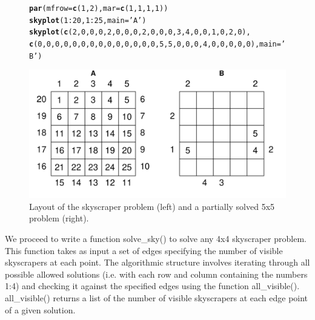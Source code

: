\documentclass[12pt]{article}\usepackage[]{graphicx}\usepackage[]{color}
\makeatletter
\newcommand{\hlnum}[1]{\textcolor[rgb]{0.686,0.059,0.569}{#1}}%
\newcommand{\hlstr}[1]{\textcolor[rgb]{0.192,0.494,0.8}{#1}}%
\newcommand{\hlopt}[1]{\textcolor[rgb]{0,0,0}{#1}}%
\newcommand{\hlstd}[1]{\textcolor[rgb]{0.345,0.345,0.345}{#1}}%
\newcommand{\hlkwc}[1]{\textcolor[rgb]{0.333,0.667,0.333}{#1}}%
\newcommand{\hlkwd}[1]{\textcolor[rgb]{0.737,0.353,0.396}{\textbf{#1}}}%
\newenvironment{kframe}{%
 \def\at@end@of@kframe{}%
 \ifinner\ifhmode%
  \def\at@end@of@kframe{\end{minipage}}%
  \begin{minipage}{\columnwidth}%
 \fi\fi%
 \def\FrameCommand##1{\hskip\@totalleftmargin \hskip-\fboxsep
 \colorbox{shadecolor}{##1}\hskip-\fboxsep
     \hskip-\linewidth \hskip-\@totalleftmargin \hskip\columnwidth}%
 \MakeFramed {\advance\hsize-\width
   \@totalleftmargin\z@ \linewidth\hsize
   \@setminipage}}%
 {\par\unskip\endMakeFramed%
 \at@end@of@kframe}
\newenvironment{knitrout}{}{} %
\makeatother
\begin{document}
\begin{figure}[h!]
  \centering
\begin{knitrout}
\color{fgcolor}\begin{kframe}
\begin{alltt}
\hlkwd{par}\hlstd{(}\hlkwc{mfrow}\hlstd{=}\hlkwd{c}\hlstd{(}\hlnum{1}\hlstd{,}\hlnum{2}\hlstd{),}\hlkwc{mar}\hlstd{=}\hlkwd{c}\hlstd{(}\hlnum{1}\hlstd{,}\hlnum{1}\hlstd{,}\hlnum{1}\hlstd{,}\hlnum{1}\hlstd{))}
\hlkwd{skyplot}\hlstd{(} \hlnum{1}\hlopt{:}\hlnum{20}\hlstd{,} \hlnum{1}\hlopt{:}\hlnum{25}\hlstd{,} \hlkwc{main} \hlstd{=} \hlstr{'A'}\hlstd{)}
\hlkwd{skyplot}\hlstd{(} \hlkwd{c}\hlstd{(}\hlnum{2}\hlstd{,}\hlnum{0}\hlstd{,}\hlnum{0}\hlstd{,}\hlnum{0}\hlstd{,}\hlnum{2}\hlstd{,}  \hlnum{0}\hlstd{,}\hlnum{0}\hlstd{,}\hlnum{0}\hlstd{,}\hlnum{2}\hlstd{,}\hlnum{0}\hlstd{,}  \hlnum{0}\hlstd{,}\hlnum{0}\hlstd{,}\hlnum{3}\hlstd{,}\hlnum{4}\hlstd{,}\hlnum{0}\hlstd{,}  \hlnum{0}\hlstd{,}\hlnum{1}\hlstd{,}\hlnum{0}\hlstd{,}\hlnum{2}\hlstd{,}\hlnum{0}\hlstd{),}
         \hlkwd{c}\hlstd{(}\hlnum{0}\hlstd{,}\hlnum{0}\hlstd{,}\hlnum{0}\hlstd{,}\hlnum{0}\hlstd{,}\hlnum{0}\hlstd{,}  \hlnum{0}\hlstd{,}\hlnum{0}\hlstd{,}\hlnum{0}\hlstd{,}\hlnum{0}\hlstd{,}\hlnum{0}\hlstd{,}  \hlnum{0}\hlstd{,}\hlnum{0}\hlstd{,}\hlnum{0}\hlstd{,}\hlnum{0}\hlstd{,}\hlnum{5}\hlstd{,}  \hlnum{5}\hlstd{,}\hlnum{0}\hlstd{,}\hlnum{0}\hlstd{,}\hlnum{0}\hlstd{,}\hlnum{4}\hlstd{,} \hlnum{0}\hlstd{,}\hlnum{0}\hlstd{,}\hlnum{0}\hlstd{,}\hlnum{0}\hlstd{,}\hlnum{0}\hlstd{),} \hlkwc{main}\hlstd{=}\hlstr{'B'}\hlstd{)}
\end{alltt}
\end{kframe}
\includegraphics[width=.7\linewidth]{figure/unnamed-chunk-3-1} 

\end{knitrout}
\caption{Layout of the skyscraper problem (left) and a partially solved 5x5 problem (right).}
\label{fig:plot1}
\end{figure}

We proceed to write a function solve\_sky() to solve any 4x4 skyscraper problem. This function takes as input a set of edges specifying the number of visible skyscrapers at each point. The algorithmic structure involves iterating through all possible allowed solutions (i.e. with each row and column containing the numbers 1:4) and checking it against the specified edges using the function all\_visible(). all\_visible() returns a list of the number of visible skyscrapers at each edge point of a given solution.
\end{document}
